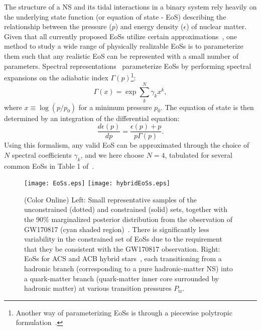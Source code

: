 \documentclass[prd,twocolumn,nofootinbib,superscriptaddress,amsmath,amssymb]{revtex4-1}
\begin{document}
The structure of a NS and its tidal interactions in a binary system rely heavily on the underlying state function (or equation of state - EoS) describing the relationship between the pressure ($p$) and energy density ($\epsilon$) of nuclear matter.
Given that all currently proposed EoSs utilize certain approximations~\cite{Oertel:Review,Baym:Review}, one method to study a wide range of physically realizable EoSs is to parameterize them such that any realistic EoS can be represented with a small number of parameters.
Spectral representations~\cite{Lindblom:2010bb,Lindblom:2012zi,Lindblom:2013kra,Lindblom:2018rfr,Abbott:2018exr} parameterize EoSs by performing spectral expansions on the adiabatic index $\Gamma(p)$\footnote{Another way of parameterizing EoSs is through a piecewise polytropic formulation~\cite{Read2009,Lackey:2014fwa,Carney:2018sdv}.}:
\begin{equation}
\Gamma(x) = \exp{\sum_k^{N}\gamma_k x^k},
\end{equation}
where $x \equiv \log{(p/p_0)}$ for a minimum pressure $p_0$.
The equation of state is then determined by an integration of the differential equation:
\begin{equation}
\frac{d \epsilon(p)}{dp}=\frac{\epsilon(p)+p}{p \Gamma(p)}.
\end{equation}
Using this formalism, any valid EoS can be approximated through the choice of $N$ spectral coefficients $\gamma_k$, and we here choose $N=4$, tabulated for several common EoSs in Table 1 of~\cite{Lindblom:2018rfr}.

\begin{figure*}
\begin{center} 
\texttt{[image: EoSs.eps]}
\texttt{[image: hybridEoSs.eps]}
\end{center}
\caption{(Color Online) Left: Small representative samples of the unconstrained (dotted) and constrained (solid) sets, together with the 90\% marginalized posterior distribution from the observation of GW170817 (cyan shaded region)~\cite{LIGO:posterior}. There is significantly less variability in the constrained set of EoSs due to the requirement that they be consistent with the GW170817 observation. Right: EoSs for ACS and ACB hybrid stars~\cite{Paschalidis2018}, each transitioning from a hadronic branch (corresponding to a pure hadronic-matter NS) into a quark-matter branch (quark-matter inner core surrounded by hadronic matter) at various transition pressures $P_{\text{tr}}$.
}
\label{fig:eos}
\end{figure*} 
\end{document}
